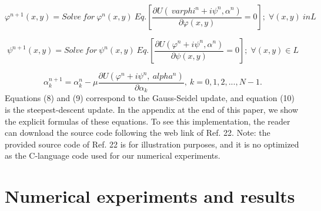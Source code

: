 \begin{equation}
\varphi^{n+1}(x,y)=Solve\: for\:\varphi^{n}(x,y)\: Eq.\left[\frac{\partial U(\
varphi^{n}+i\psi^{n},\alpha^{n})}{\partial\varphi(x,y)}=0\right];\;\forall(x,y)\
in L
\end{equation}


\begin{equation}
\psi^{n+1}(x,y)=Solve\: for\:\psi^{n}(x,y)\: Eq.\left[\frac{\partial U(\varphi^{
n}+i\psi^{n},\alpha^{n})}{\partial\psi(x,y)}=0\right];\;\forall(x,y)\in L
\end{equation}


\begin{equation}
\alpha_{k}^{n+1}=\alpha_{k}^{n}-\mu\frac{\partial U(\varphi^{n}+i\psi^{n},\
alpha^{n})}{\partial\alpha_{k}},\: k=0,1,2,...,N-1.
\end{equation}
Equations (8) and (9) correspond to the Gauss-Seidel update, and equation
(10) is the steepest-descent update. In the appendix at the end of
this paper, we show the explicit formulas of these equations. To see
this implementation, the reader can download the source code following
the web link of Ref. 22. Note: the provided source code of Ref. 22
is for illustration purposes, and it is no optimized as the C-language
code used for our numerical experiments.


\section{Numerical experiments and results}

